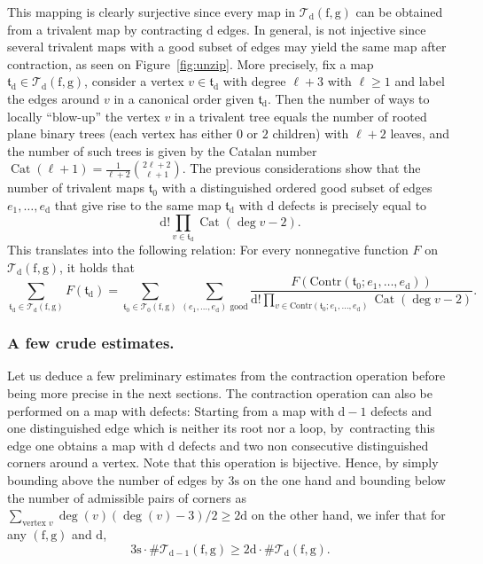 \documentclass[11pt]{article}
\DeclareMathOperator{\Cat}{Cat}
\theoremstyle{plain}
\theoremstyle{definition}
\theoremstyle{remark}
\newcommand{\face}{\mathrm{f}}
\newcommand{\defect}{\mathrm{d}}
\newcommand{\gen}{\mathrm{g}}
\newcommand{\spar}{\mathrm{s}}
\begin{document}
This mapping is clearly surjective since every map in $\mathcal{T}_\defect(\face, \gen)$ can be obtained from a trivalent map by contracting $\defect$ edges. In general, is not injective since several trivalent maps with a good subset of edges may yield the same map after contraction, as seen on Figure~\ref{fig:unzip}.
More precisely, fix a map $\mathfrak{t}_\defect \in \mathcal{T}_\defect(\face, \gen)$, consider a vertex $v \in \mathfrak{t}_\defect$ with degree $\ell+3$ with $\ell \geq 1$ and label the edges around $v$ in a canonical order given $\mathfrak{t}_\defect$. Then the number of ways to locally ``blow-up'' the vertex $v$ in a trivalent tree equals the number of rooted plane binary trees (each vertex has either $0$ or $2$ children) with $\ell+2$ leaves, and the number of such trees is given by the Catalan number $\Cat(\ell+1) = \frac{1}{\ell+2} \binom{2\ell+2}{\ell+1}$. The previous considerations show that the number of trivalent maps $\mathfrak{t}_0$ with a distinguished ordered good subset of edges $e_1, \dots, e_\defect$ that give rise to the same map $\mathfrak{t}_\defect$ with $\defect$ defects is precisely equal to\[
\defect! \prod_{v \in \mathfrak{t}_\defect} \Cat(\deg v - 2).
\]
This translates into the following relation: For every nonnegative function $F$ on $\mathcal{T}_\defect(\face, \gen)$, it holds that
\begin{equation}\label{eq:bijection_defauts}
\sum_{\mathfrak{t}_\defect \in \mathcal{T}_\defect(\face, \gen)} F(\mathfrak{t}_\defect)
= \sum_{\mathfrak{t}_0 \in \mathcal{T}_0(\face, \gen)} \sum_{(e_1, \dots, e_\defect) \text{ good}} \frac{F(\mathrm{Contr}(\mathfrak{t}_0 ; e_1, \dots, e_\defect))}{\defect! \prod_{v \in \mathrm{Contr}(\mathfrak{t}_0 ; e_1, \dots, e_\defect)} \Cat(\deg v - 2)}.
\end{equation}

\subsubsection*{A few crude estimates.}
Let us deduce a few preliminary estimates from the contraction operation before being more precise in the next sections.
The contraction operation can also be performed on a map with defects: Starting from a map with $\defect-1$ defects and one distinguished edge which is neither its root nor a loop, by~contracting this edge one obtains a map with $\defect$ defects and two non consecutive distinguished corners around a vertex. Note that this operation is bijective. Hence, by simply bounding above the number of edges by $3\spar$ on the one hand and bounding below the number of admissible pairs of corners as $\sum_{\textrm{vertex } v} \deg(v) (\deg(v)-3) / 2 \ge 2\defect$ on the other hand, we infer that for any $(\face, \gen)$ and $\defect$,
\begin{equation}\label{eq:crude1}
3 \spar \cdot \# \mathcal{T}_{\defect-1}(\face,\gen) \ge 2 \defect \cdot \# \mathcal{T}_{\defect}(\face,\gen).
\end{equation}
\end{document}
